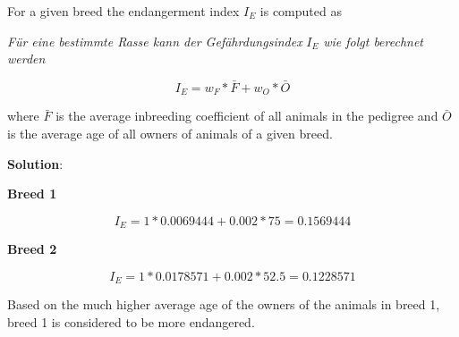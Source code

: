 \documentclass[
]{article}
\newenvironment{Shaded}{\begin{snugshade}}{\end{snugshade}}
\newcommand{\DecValTok}[1]{\textcolor[rgb]{0.00,0.00,0.81}{#1}}
\newcommand{\FunctionTok}[1]{\textcolor[rgb]{0.00,0.00,0.00}{#1}}
\newcommand{\NormalTok}[1]{#1}
\newcommand{\OtherTok}[1]{\textcolor[rgb]{0.56,0.35,0.01}{#1}}
\newcommand{\SpecialCharTok}[1]{\textcolor[rgb]{0.00,0.00,0.00}{#1}}
\newcommand{\solstart}
{\vspace{3ex}\textbf{Solution}:}
\begin{document}
For a given breed the endangerment index \(I_E\) is computed as

\textit{Für eine bestimmte Rasse kann der Gefährdungsindex } \(I_E\)
\textit{ wie folgt berechnet werden}

\[I_E = w_F * \bar{F} + w_O * \bar{O}\]

where \(\bar{F}\) is the average inbreeding coefficient of all animals
in the pedigree and \(\bar{O}\) is the average age of all owners of
animals of a given breed.

\vspace{3ex}
\solstart

\textbf{Breed 1}

\begin{Shaded}
\end{Shaded}

\[I_E = 1 * 0.0069444 + 0.002 * 75 =  0.1569444\]

\textbf{Breed 2}

\begin{Shaded}
\end{Shaded}

\[I_E = 1 * 0.0178571 + 0.002 * 52.5 =  0.1228571\]

Based on the much higher average age of the owners of the animals in
breed 1, breed 1 is considered to be more endangered.
\end{document}
